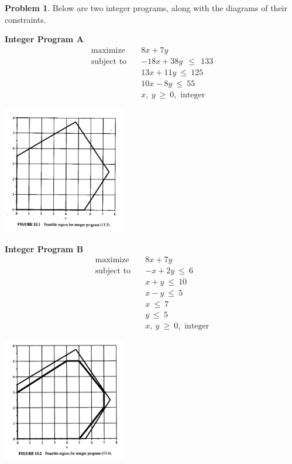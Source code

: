 \documentclass[11pt]{article}
\theoremstyle{definition}
\newtheorem{problem}{Problem}
\newcommand{\maximize}{\text{maximize}}
\newcommand{\subjectto}{\text{subject to}}
\begin{document}
\newpage
\begin{problem}  
Below are two integer programs, along with the diagrams of their constraints.

\begin{multicols}{2}

{\bf Integer Program A}
\begin{align*}
      \maximize \quad & 8x + 7y \\
      \subjectto \quad & -18x + 38y ~~\leq~~ 133\\
                       & 13x + 11y ~\leq~ 125\\
                       & 10x - 8y ~\leq~ 55\\
                       & x,~y ~\geq~ 0, \text{ integer}
\end{align*}
\vspace{6cm}

\includegraphics[width = 0.4\textwidth]{formulation_bad}
\end{multicols}

\begin{multicols}{2}

{\bf Integer Program B}
\begin{align*}
      \maximize \quad & 8x + 7y \\
      \subjectto \quad & -x+2y ~\leq~ 6\\
                       & x + y ~\leq~ 10\\
                       & x - y ~\leq~ 5\\
                       & x ~\leq~ 7\\
                       & y ~\leq~ 5\\
                       & x,~y ~\geq~ 0, \text{ integer}
\end{align*}
\vspace{6cm}

\includegraphics[width = 0.4\textwidth]{formulation_ideal}
\end{multicols}



\end{problem}
\end{document}
